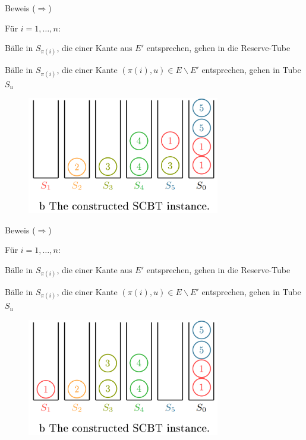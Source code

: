 \documentclass{beamer}
\begin{document}
\begin{frame}{Beweis (\glqq $\Rightarrow$\grqq)}
\begin{pointlist}
\item Für $i=1,\dots,n$:
\begin{arrowlist}
\item Bälle in $S_{\pi(i)}$, die einer Kante aus $E'$ entsprechen, gehen in die Reserve-Tube 
\item Bälle in $S_{\pi(i)}$, die einer Kante $(\pi(i),u)\in E\backslash E'$ entsprechen, gehen in Tube $S_u$
\end{arrowlist}
\end{pointlist}
\begin{figure}
    \centering
    \includegraphics[width=0.75\textwidth]{proofr3}
\end{figure}
\end{frame}

\begin{frame}{Beweis (\glqq $\Rightarrow$\grqq)}
\begin{pointlist}
\item Für $i=1,\dots,n$:
\begin{arrowlist}
\item Bälle in $S_{\pi(i)}$, die einer Kante aus $E'$ entsprechen, gehen in die Reserve-Tube 
\item Bälle in $S_{\pi(i)}$, die einer Kante $(\pi(i),u)\in E\backslash E'$ entsprechen, gehen in Tube $S_u$
\end{arrowlist}
\end{pointlist}
\begin{figure}
    \centering
    \includegraphics[width=0.75\textwidth]{proofr4}
\end{figure}
\end{frame}
\end{document}
